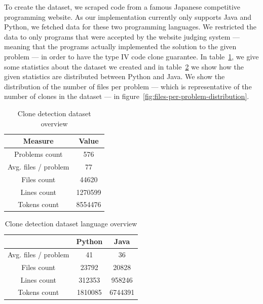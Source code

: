To create the dataset, we scraped code from a famous Japanese competitive
programming website. As our implementation currently only supports Java and
Python, we fetched data for these two programming languages. We restricted the
data to only programs that were accepted by the website judging system --- meaning
that the programs actually implemented the solution to the given problem --- in
order to have the type IV code clone guarantee. In
table~\ref{tab:clone-dataset-overview}, we give some statistics about the
dataset we created and in table~\ref{tab:clone-dataset-languages} we show how
the given statistics are distributed between Python and Java. We show the
distribution of the number of files per problem --- which is representative of
the number of clones in the dataset --- in
figure~\ref{fig:files-per-problem-distribution}.

\begin{table}
  \caption{\label{tab:clone-dataset-overview} Clone detection dataset overview}
  \begin{center}
    \begin{tabular}{c c}
      \toprule
      Measure & Value\\
      \toprule
      Problems count & 576\\
      Avg. files / problem & 77\\
      Files count & 44620\\
      Lines count & 1270599\\
      Tokens count & 8554476\\
      \bottomrule
    \end{tabular}
  \end{center}
\end{table}

\begin{table}
  \caption{\label{tab:clone-dataset-languages} Clone detection dataset language overview}
  \begin{center}
    \begin{tabular}{c c c}
      \toprule
      & Python & Java\\
      \toprule
      Avg. files / problem & 41 & 36\\
      Files count & 23792 & 20828\\
      Lines count & 312353 & 958246\\
      Tokens count & 1810085 & 6744391\\
      \bottomrule
    \end{tabular}
  \end{center}
\end{table}

